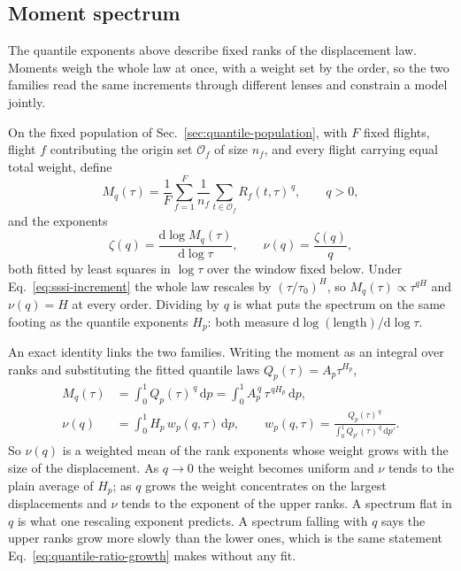 \subsection{Moment spectrum}
\label{sec:moment-spectrum}

The quantile exponents above describe fixed ranks of the displacement law. Moments
weigh the whole law at once, with a weight set by the order, so the two families read
the same increments through different lenses and constrain a model jointly.

On the fixed population of Sec.~\ref{sec:quantile-population}, with $F$ fixed flights,
flight $f$ contributing the origin set $\mathcal O_f$ of size $n_f$, and every flight
carrying equal total weight, define
\begin{equation}
  M_q(\tau)=\frac1F\sum_{f=1}^{F}\frac{1}{n_f}
            \sum_{t\in\mathcal O_f}R_f(t,\tau)^{\,q},
  \qquad q>0,
  \label{eq:equal-flight-moment}
\end{equation}
and the exponents
\begin{equation}
  \zeta(q)=\frac{\mathrm d\log M_q(\tau)}{\mathrm d\log\tau},
  \qquad
  \nu(q)=\frac{\zeta(q)}{q},
  \label{eq:moment-exponents}
\end{equation}
both fitted by least squares in $\log\tau$ over the window fixed below.
Under Eq.~\eqref{eq:sssi-increment} the whole law rescales by $(\tau/\tau_0)^H$, so
$M_q(\tau)\propto\tau^{qH}$ and $\nu(q)=H$ at every order. Dividing by $q$ is what puts
the spectrum on the same footing as the quantile exponents $H_p$: both measure
$\mathrm d\log(\text{length})/\mathrm d\log\tau$.

An exact identity links the two families. Writing the moment as an integral over ranks and
substituting the fitted quantile laws $Q_p(\tau)=A_p\tau^{H_p}$,
\begin{equation}
  \begin{aligned}
  M_q(\tau)&=\int_0^1 Q_p(\tau)^{\,q}\,\mathrm dp
           =\int_0^1 A_p^{\,q}\,\tau^{\,qH_p}\,\mathrm dp,\\
  \nu(q)&=\int_0^1 H_p\,w_p(q,\tau)\,\mathrm dp,
  \qquad
  w_p(q,\tau)=\frac{Q_p(\tau)^{\,q}}{\int_0^1 Q_{p'}(\tau)^{\,q}\,\mathrm dp'}.
  \end{aligned}
  \label{eq:nu-as-weighted-rank-exponent}
\end{equation}
So $\nu(q)$ is a weighted mean of the rank exponents whose weight grows with the size
of the displacement. As $q\to0$ the weight becomes uniform and $\nu$ tends to the plain
average of $H_p$; as $q$ grows the weight concentrates on the largest displacements and
$\nu$ tends to the exponent of the upper ranks. A spectrum flat in $q$ is what one
rescaling exponent predicts. A spectrum falling with $q$ says the upper ranks grow more
slowly than the lower ones, which is the same statement
Eq.~\eqref{eq:quantile-ratio-growth} makes without any fit.

